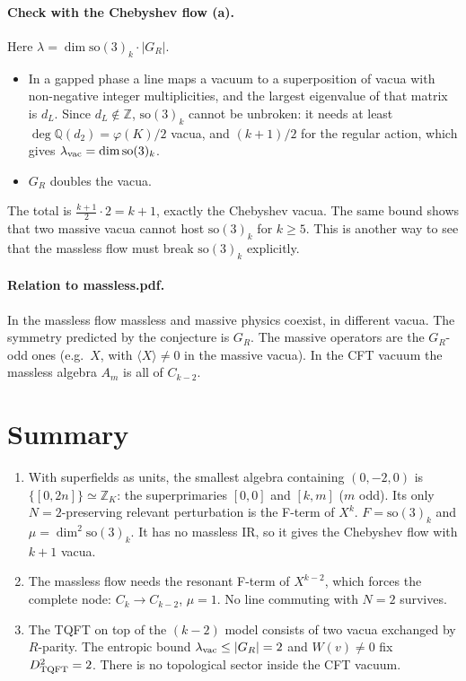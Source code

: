 \documentclass[11pt]{article}
\newcommand{\so}{\mathrm{so}(3)_k}
\newcommand{\Z}{\mathbb{Z}}
\newcommand{\Q}{\mathbb{Q}}
\begin{document}
\paragraph{Check with the Chebyshev flow (a).} Here $\lambda=\dim\so\cdot|G_R|$.
\begin{itemize}
\item In a gapped phase a line maps a vacuum to a superposition of vacua with non-negative integer multiplicities, and the largest eigenvalue of that matrix is $d_L$. Since $d_L\notin\Z$, $\so$ cannot be unbroken: it needs at least $\deg\Q(d_2)=\varphi(K)/2$ vacua, and $(k+1)/2$ for the regular action, which gives $\lambda_{\rm vac}=\dim\so$.
\item $G_R$ doubles the vacua.
\end{itemize}
The total is $\tfrac{k+1}2\cdot2=k+1$, exactly the Chebyshev vacua. The same bound shows that two massive vacua cannot host $\so$ for $k\ge5$. This is another way to see that the massless flow must break $\so$ explicitly.

\paragraph{Relation to massless.pdf.} In the massless flow massless and massive physics coexist, in different vacua. The symmetry predicted by the conjecture is $G_R$. The massive operators are the $G_R$-odd ones (e.g.\ $X$, with $\langle X\rangle\ne0$ in the massive vacua). In the CFT vacuum the massless algebra $A_m$ is all of $C_{k-2}$.

\section*{Summary}
\begin{enumerate}
\item With superfields as units, the smallest algebra containing $(0,-2,0)$ is $\{[0,2n]\}\simeq\Z_K$: the superprimaries $[0,0]$ and $[k,m]$ ($m$ odd). Its only $N=2$-preserving relevant perturbation is the F-term of $X^k$. $F=\so$ and $\mu=\dim^2\so$. It has no massless IR, so it gives the Chebyshev flow with $k+1$ vacua.
\item The massless flow needs the resonant F-term of $X^{k-2}$, which forces the complete node: $C_k\to C_{k-2}$, $\mu=1$. No line commuting with $N=2$ survives.
\item The TQFT on top of the $(k-2)$ model consists of two vacua exchanged by $R$-parity. The entropic bound $\lambda_{\rm vac}\le|G_R|=2$ and $W(v)\ne0$ fix $D^2_{\rm TQFT}=2$. There is no topological sector inside the CFT vacuum.
\end{enumerate}
\end{document}
